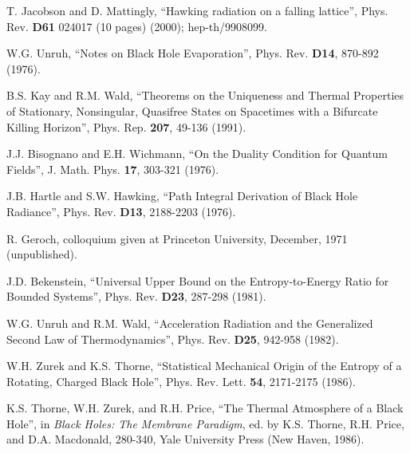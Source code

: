 \begin{thebibliography}{999}
 T. Jacobson and D. Mattingly, ``Hawking
radiation on a falling lattice'', Phys. Rev. {\bf D61} 024017 (10
pages) (2000); hep-th/9908099.  

 W.G. Unruh, ``Notes on Black Hole
Evaporation'', Phys. Rev. {\bf D14}, 870-892 (1976).

 B.S. Kay and R.M. Wald, ``Theorems on the
Uniqueness and Thermal Properties of Stationary, Nonsingular,
Quasifree States on Spacetimes with a Bifurcate Killing Horizon'',
Phys. Rep. {\bf 207}, 49-136 (1991).  

 J.J. Bisognano and E.H. Wichmann, ``On
the Duality Condition for Quantum Fields'', J. Math. Phys. {\bf 17},
303-321 (1976).

 J.B. Hartle and S.W. Hawking, ``Path
Integral Derivation of Black Hole Radiance'', Phys. Rev. {\bf D13},
2188-2203 (1976).  

 R. Geroch, colloquium given at
Princeton University, December, 1971 (unpublished).

 J.D. Bekenstein, ``Universal Upper Bound
on the Entropy-to-Energy Ratio for Bounded Systems'', Phys. Rev. {\bf
D23}, 287-298 (1981).  

 W.G. Unruh and R.M. Wald, ``Acceleration
Radiation and the Generalized Second Law of Thermodynamics'',
Phys. Rev. {\bf D25}, 942-958 (1982). 

 W.H. Zurek and K.S. Thorne,
``Statistical Mechanical Origin of the Entropy of a Rotating, Charged
Black Hole'', Phys. Rev. Lett. {\bf 54}, 2171-2175
(1986). 

 K.S. Thorne, W.H. Zurek, and R.H. Price,
``The Thermal Atmosphere of a Black Hole'', in {\it Black Holes: The
Membrane Paradigm}, ed. by K.S. Thorne, R.H. Price, and
D.A. Macdonald, 280-340, Yale University Press (New Haven, 1986).


\end{thebibliography}
